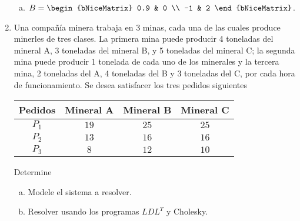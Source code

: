 \documentclass[
	spanish,
	8pt,
	utf8,
	xcolor=table,
	handout,
	aspectratio=169,
	professionalfonts,
	notheorems,
	mathserif,
]{beamer}
\begin{document}
\begin{frame}
\begin{enumerate}
\begin{multicols}{2}
\begin{enumerate}[a)]
				      \item


				            \begin{math}
					            B=
					            \begin{bNiceMatrix}
						            0.9 & 0 \\
						            -1  & 2
					            \end{bNiceMatrix}
				            \end{math}.
			      \end{enumerate}
		      \end{multicols}

		\item

		      Una compañía minera trabaja en 3 minas, cada una de las
		      cuales produce minerles de tres clases.
		      La primera mina puede producir 4 toneladas del mineral A, 3
		      toneladas del mineral B, y 5 toneladas del mineral C; la
		      segunda mina puede producir 1 tonelada de cada uno de los
		      minerales y la tercera mina, 2 toneladas del A,
		      4 toneladas del B y 3 toneladas del C, por cada hora de
		      funcionamiento.
		      Se desea satisfacer los tres pedidos siguientes
		      \begin{table}[ht!]
			      \centering
			      \tiny
			      \begin{tabular}{|c|c|c|c|}
				      \hline
				      Pedidos & Mineral A & Mineral B & Mineral C \\
				      \hline
				      $P_{1}$ & $19$      & $25$      & $25$      \\
				      \hline
				      $P_{2}$ & $13$      & $16$      & $16$      \\
				      \hline
				      $P_{3}$ & $8$       & $12$      & $10$      \\
				      \hline
			      \end{tabular}
		      \end{table}

		      Determine
		      \begin{multicols}{2}

			      \begin{enumerate}[a)]
				      \item

				            Modele el sistema a resolver.

				      \item

				            Resolver usando los programas $LDL^{T}$ y Cholesky.
			      \end{enumerate}
		      \end{multicols}


\end{enumerate}
\end{frame}
\end{document}
